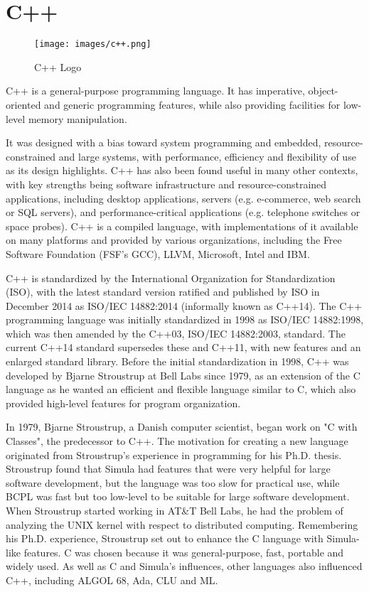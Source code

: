 \section{C++}

\begin{figure}[H]
	\centering \texttt{[image: images/c++.png]}
	\caption{C++ Logo}
	\label{fig:c++}
\end{figure}

C++ is a general-purpose programming language. It has imperative, object-oriented and generic programming features, while also providing facilities for low-level memory manipulation.

It was designed with a bias toward system programming and embedded, resource-constrained and large systems, with performance, efficiency and flexibility of use as its design highlights. C++ has also been found useful in many other contexts, with key strengths being software infrastructure and resource-constrained applications, including desktop applications, servers (e.g. e-commerce, web search or SQL servers), and performance-critical applications (e.g. telephone switches or space probes). C++ is a compiled language, with implementations of it available on many platforms and provided by various organizations, including the Free Software Foundation (FSF's GCC), LLVM, Microsoft, Intel and IBM.

C++ is standardized by the International Organization for Standardization (ISO), with the latest standard version ratified and published by ISO in December 2014 as ISO/IEC 14882:2014 (informally known as C++14). The C++ programming language was initially standardized in 1998 as ISO/IEC 14882:1998, which was then amended by the C++03, ISO/IEC 14882:2003, standard. The current C++14 standard supersedes these and C++11, with new features and an enlarged standard library. Before the initial standardization in 1998, C++ was developed by Bjarne Stroustrup at Bell Labs since 1979, as an extension of the C language as he wanted an efficient and flexible language similar to C, which also provided high-level features for program organization.

In 1979, Bjarne Stroustrup, a Danish computer scientist, began work on "C with Classes", the predecessor to C++. The motivation for creating a new language originated from Stroustrup's experience in programming for his Ph.D. thesis. Stroustrup found that Simula had features that were very helpful for large software development, but the language was too slow for practical use, while BCPL was fast but too low-level to be suitable for large software development. When Stroustrup started working in AT\&T Bell Labs, he had the problem of analyzing the UNIX kernel with respect to distributed computing. Remembering his Ph.D. experience, Stroustrup set out to enhance the C language with Simula-like features. C was chosen because it was general-purpose, fast, portable and widely used. As well as C and Simula's influences, other languages also influenced C++, including ALGOL 68, Ada, CLU and ML.

